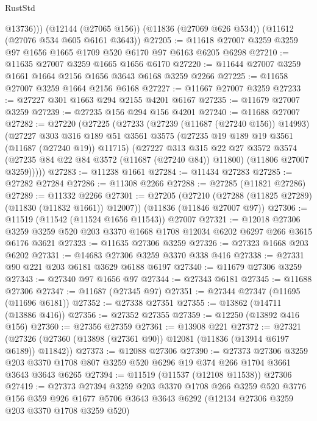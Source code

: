 \begin{lexlean}{RustStd}
\begin{coremodule}
          @13736)))
    (@12144 (@27065 @156))
    (@11836 (@27069 @626 @534))
    (@11612 (@27076 @534 @605 @6161 @3643))
@27205 := @11618 @27007 @3259 @3259 @97 @1656 @1665 @1709 @520 @6170 @97 @6163 @6205 @6298
@27210 := @11635 @27007 @3259 @1665 @1656 @6170
@27220 := @11644 @27007 @3259 @1661 @1664 @2156 @1656 @3643 @6168 @3259 @2266
@27225 := @11658 @27007 @3259 @1664 @2156 @6168
@27227 := @11667 @27007 @3259
@27233 := @27227 @301 @1663 @294 @2155 @4201 @6167
@27235 := @11679 @27007 @3259
@27239 := @27235 @156 @294 @156 @4201
@27240 := @11688 @27007
@27282 := @27220
    (@27225
      (@27233
        (@27239 (@11687 (@27240 @156)) @14993)
        (@27227
          @303
          @316
          @189
          @51
          @3561
          @3575
          (@27235 @19 @189 @19 @3561 (@11687 (@27240 @19)) @11715)
          (@27227
            @313
            @315
            @22
            @27
            @3572
            @3574
            (@27235 @84 @22 @84 @3572 (@11687 (@27240 @84)) @11800)
            (@11806 @27007 @3259)))))
@27283 := @11238 @1661
@27284 := @11434 @27283
@27285 := @27282 @27284
@27286 := @11308 @2266
@27288 := @27285 (@11821 @27286)
@27289 := @11332 @2266
@27301 := @27205
    (@27210 (@27288 (@11825 @27289) (@11830 (@11832 @1661)) @12007))
    (@11836 (@11846 @27007 @97))
@27306 := @11519 (@11542 (@11524 @1656 @11543)) @27007
@27321 := @12018
    @27306
    @3259
    @3259
    @520
    @203
    @3370
    @1668
    @1708
    @12034
    @6202
    @6297
    @266
    @3615
    @6176
    @3621
@27323 := @11635 @27306 @3259
@27326 := @27323 @1668 @203 @6202
@27331 := @14683 @27306 @3259 @3370 @338 @416
@27338 := @27331 @90 @221 @203 @6181 @3629 @6188 @6197
@27340 := @11679 @27306 @3259
@27343 := @27340 @97 @1656 @97
@27344 := @27343 @6181
@27345 := @11688 @27306
@27347 := @11687 (@27345 @97)
@27351 := @27344 @27347 (@11695 (@11696 @6181))
@27352 := @27338 @27351
@27355 := @13862 (@14711 (@13886 @416))
@27356 := @27352 @27355
@27359 := @12250 (@13892 @416 @156)
@27360 := @27356 @27359
@27361 := @13908 @221
@27372 := @27321 (@27326 (@27360 (@13898 (@27361 @90)) @12081 (@11836 (@13914 @6197 @6189)) @11842))
@27373 := @12088 @27306
@27390 := @27373
    @27306
    @3259
    @203
    @3370
    @1708
    @807
    @3259
    @520
    @6296
    @19
    @374
    @266
    @1704
    @3661
    @3643
    @3643
    @6265
@27394 := @11519 (@11537 (@12108 @11538)) @27306
@27419 := @27373
    @27394
    @3259
    @203
    @3370
    @1708
    @266
    @3259
    @520
    @3776
    @156
    @359
    @926
    @1677
    @5706
    @3643
    @3643
    @6292
    (@12134 @27306 @3259 @203 @3370 @1708 @3259 @520)

\end{coremodule}
\end{lexlean}
